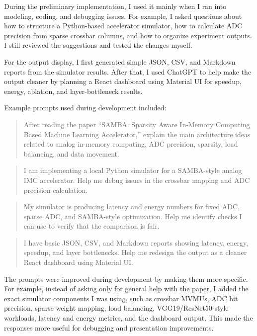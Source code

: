 \documentclass[11pt]{article}
\begin{document}
During the preliminary implementation, I used it mainly when I ran into modeling, coding, and debugging issues. For example, I asked questions about how to structure a Python-based accelerator simulator, how to calculate ADC precision from sparse crossbar columns, and how to organize experiment outputs. I still reviewed the suggestions and tested the changes myself.

For the output display, I first generated simple JSON, CSV, and Markdown reports from the simulator results. After that, I used ChatGPT to help make the output cleaner by planning a React dashboard using Material UI for speedup, energy, ablation, and layer-bottleneck results.

Example prompts used during development included:

\begin{quote}
After reading the paper ``SAMBA: Sparsity Aware In-Memory Computing Based Machine Learning Accelerator,'' explain the main architecture ideas related to analog in-memory computing, ADC precision, sparsity, load balancing, and data movement.
\end{quote}

\begin{quote}
I am implementing a local Python simulator for a SAMBA-style analog IMC accelerator. Help me debug issues in the crossbar mapping and ADC precision calculation.
\end{quote}

\begin{quote}
My simulator is producing latency and energy numbers for fixed ADC, sparse ADC, and SAMBA-style optimization. Help me identify checks I can use to verify that the comparison is fair.
\end{quote}

\begin{quote}
I have basic JSON, CSV, and Markdown reports showing latency, energy, speedup, and layer bottlenecks. Help me redesign the output as a cleaner React dashboard using Material UI.
\end{quote}

The prompts were improved during development by making them more specific. For example, instead of asking only for general help with the paper, I added the exact simulator components I was using, such as crossbar MVMUs, ADC bit precision, sparse weight mapping, load balancing, VGG19/ResNet50-style workloads, latency and energy metrics, and the dashboard output. This made the responses more useful for debugging and presentation improvements.
\end{document}
